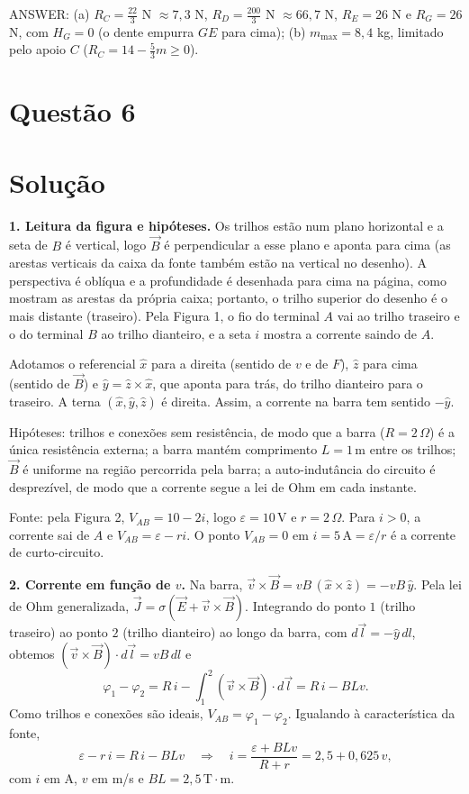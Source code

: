 \documentclass{article}%
\begin{document}
ANSWER: (a) $R_C=\frac{22}{3}$ N $\approx 7{,}3$ N, $R_D=\frac{200}{3}$ N $\approx 66{,}7$ N, $R_E=26$ N e $R_G=26$ N, com $H_G=0$ (o dente empurra $GE$ para cima); (b) $m_{\max}=8{,}4$ kg, limitado pelo apoio $C$ ($R_C=14-\frac{5}{3}m\geq 0$).%
\newpage%
\section*{Questão 6}

\section*{Solução}

\textbf{1. Leitura da figura e hipóteses.} Os trilhos estão num plano horizontal e a seta de $B$ é vertical, logo $\vec B$ é perpendicular a esse plano e aponta para cima (as arestas verticais da caixa da fonte também estão na vertical no desenho). A perspectiva é oblíqua e a profundidade é desenhada para cima na página, como mostram as arestas da própria caixa; portanto, o trilho superior do desenho é o mais distante (traseiro). Pela Figura 1, o fio do terminal $A$ vai ao trilho traseiro e o do terminal $B$ ao trilho dianteiro, e a seta $i$ mostra a corrente saindo de $A$.

Adotamos o referencial $\hat x$ para a direita (sentido de $v$ e de $F$), $\hat z$ para cima (sentido de $\vec B$) e $\hat y=\hat z\times\hat x$, que aponta para trás, do trilho dianteiro para o traseiro. A terna $(\hat x,\hat y,\hat z)$ é direita. Assim, a corrente na barra tem sentido $-\hat y$.

Hipóteses: trilhos e conexões sem resistência, de modo que a barra ($R=2\,\Omega$) é a única resistência externa; a barra mantém comprimento $L=1\,\text{m}$ entre os trilhos; $\vec B$ é uniforme na região percorrida pela barra; a auto-indutância do circuito é desprezível, de modo que a corrente segue a lei de Ohm em cada instante.

Fonte: pela Figura 2, $V_{AB}=10-2i$, logo $\varepsilon=10\,\text{V}$ e $r=2\,\Omega$. Para $i>0$, a corrente sai de $A$ e $V_{AB}=\varepsilon-ri$. O ponto $V_{AB}=0$ em $i=5\,\text{A}=\varepsilon/r$ é a corrente de curto-circuito.

\textbf{2. Corrente em função de $v$.} Na barra, $\vec v\times\vec B=vB\,(\hat x\times\hat z)=-vB\,\hat y$. Pela lei de Ohm generalizada, $\vec J=\sigma(\vec E+\vec v\times\vec B)$. Integrando do ponto $1$ (trilho traseiro) ao ponto $2$ (trilho dianteiro) ao longo da barra, com $d\vec l=-\hat y\,dl$, obtemos $(\vec v\times\vec B)\cdot d\vec l=vB\,dl$ e
\[
\varphi_1-\varphi_2 = R\,i-\int_1^2(\vec v\times\vec B)\cdot d\vec l = R\,i-BLv .
\]
Como trilhos e conexões são ideais, $V_{AB}=\varphi_1-\varphi_2$. Igualando à característica da fonte,
\[
\varepsilon-r\,i=R\,i-BLv \quad\Rightarrow\quad i=\frac{\varepsilon+BLv}{R+r}=2{,}5+0{,}625\,v ,
\]
com $i$ em A, $v$ em m/s e $BL=2{,}5\,\text{T}\cdot\text{m}$.
\end{document}
